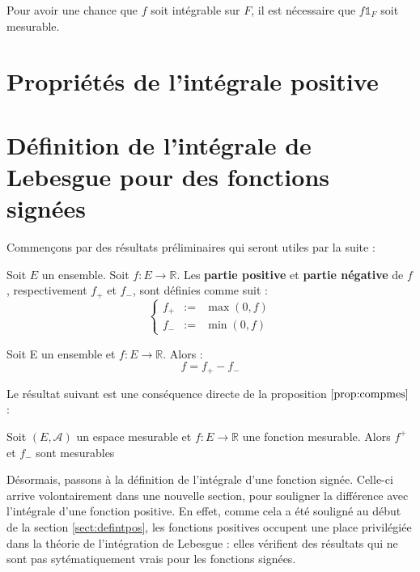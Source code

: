 \documentclass[../integ-proba.tex]{subfiles}
\begin{document}
\begin{rem}
  Pour avoir une chance que $f$ soit intégrable sur $F$, il est nécessaire que $f\mathds{1}_F$ soit mesurable.
\end{rem}

\section{Propriétés de l'intégrale positive}


\section{Définition de l'intégrale de Lebesgue pour des fonctions signées}

Commençons par des résultats préliminaires qui seront utiles par la suite :

\begin{defi}
  \label{def:partieposneg}
  Soit $E$ un ensemble.
  Soit $f:E\longrightarrow\mathbb{R}$.
  Les \textbf{partie positive} et \textbf{partie négative} de $f$, respectivement $f_+$ et $f_-$, sont définies comme suit :
  $$
  \left\{
    \begin{array}{rcl}
      f_+&:=&\max(0,f)\\
      f_-&:=&\min(0,f)
    \end{array}
  \right.
  $$
\end{defi}

\begin{prop}
  Soit E un ensemble et $f:E\longrightarrow\mathbb{R}$.
  Alors :
  $$
  f = f_+ - f_-
  $$
\end{prop}

Le résultat suivant est une conséquence directe de la proposition $\ref{prop:compmes}$ :

\begin{prop}
  \label{prop:partiemes}
  Soit $\left(E,\mathcal{A}\right)$ un espace mesurable et $f:E\longrightarrow\mathbb{R}$ une fonction mesurable.
  Alors $f^+$ et $f_-$ sont mesurables
\end{prop}

Désormais, passons à la définition de l'intégrale d'une fonction signée. Celle-ci arrive volontairement dans une nouvelle section, pour souligner la différence avec l'intégrale d'une fonction positive.
En effet, comme cela a été souligné au début de la section \ref{sect:defintpos}, les fonctions positives occupent une place privilégiée dans la théorie de l'intégration de Lebesgue : elles vérifient des résultats qui ne sont pas sytématiquement vrais pour les fonctions signées.
\end{document}
